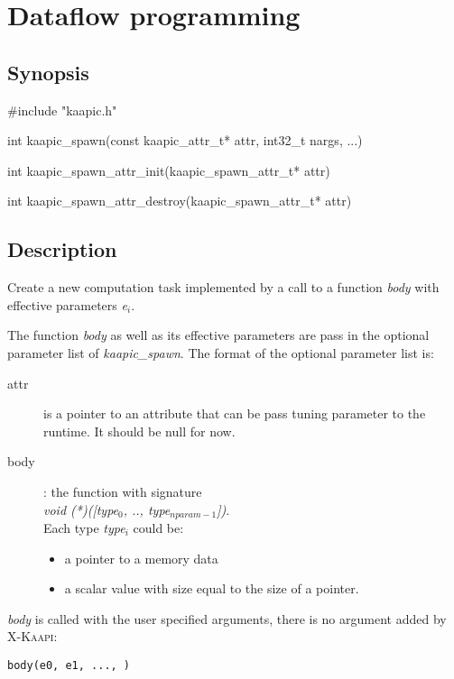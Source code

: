 \documentclass[a4paper, 11pt]{article}
\makeatletter
\newenvironment{apisection}[2][noshortnameprovided]{%
  \newpage
  \section{#2}
  \label{api@#1}
  \newcommand{\api@newpart}[4][noshortpartnameprovided]{%
    \newenvironment{##1}{%
      \subsection{##2}%
      \label{api@#1@##1}%
      ##3%
    }{##4}%
  }%
  \api@newpart[synopsis]{Synopsis}{}{}%
  \api@newpart[call]{Call}{}{}%
  \api@newpart[desc]{Description}{}{}%
  \api@newpart[params]{Parameters}{%
    \let\api@indesc\@empty
    \newcommand{\param}[1]{%
      \def\api@indesc{yes}%
      \begin{description}%
        \renewcommand{\param}[1]{\item[########1]}%
      \item[####1]
      }%
      \newenvironment{parameters}{%
        \begin{description}%
          \renewcommand{\param}[1]{\item[########1]}%
        }{%
        \end{description}%
      }
    }{%
      \ifx\api@indesc\@empty\relax\else%
    \end{description}%
    \fi%
  }%
  \api@newpart[ret]{Return value}{%
    \newcommand{\otherret}{\par\medskip\noindent}%
  }{}%
  \api@newpart[example]{Example}{}{}%
}{}
\newcommand{\fn}[1]{\textit{#1}}%
\newcommand{\kaapi}{\textsc{X-Kaapi}\xspace}
\makeatother
\begin{document}
\begin{apisection}[dataflow]{Dataflow programming}
  \begin{synopsis}
    \begin{code}
#include "kaapic.h"

int kaapic_spawn(const kaapic_attr_t* attr, int32_t nargs, ...)

int kaapic_spawn_attr_init(kaapic_spawn_attr_t* attr)

int kaapic_spawn_attr_destroy(kaapic_spawn_attr_t* attr)

    \end{code}
  \end{synopsis}
  \begin{desc}
    Create a new computation task implemented by a call to a function
    \fn{body} with effective parameters \textit{e$_i$}.

    The function \fn{body} as well as its effective parameters are pass in the optional parameter list of \fn{kaapic\_spawn}.
    The format of the optional parameter list is:
    \begin{description}
    \item[attr] is a pointer to an attribute that can be
    pass tuning parameter to the runtime. It should be null for now.

    \item [body]: the function with signature\\
      \hspace*{5ex}\textit{void (*)([type$_0$, .., type$_{nparam-1}$])}.\\
      Each type \textit{type$_i$} could be:
      \begin{itemize}
      \item a pointer to a memory data
      \item a scalar value with size equal to the size of a pointer.
      \end{itemize}
    \end{description}
    
    \fn{body} is called with the user specified arguments, there is no argument added by \kaapi:\\
    \begin{small}
      \lstset{language=C}
      \begin{lstlisting}[frame=tb]
        body(e0, e1, ..., )
      \end{lstlisting}
    \end{small}
  \end{desc}


\end{apisection}
\end{document}
